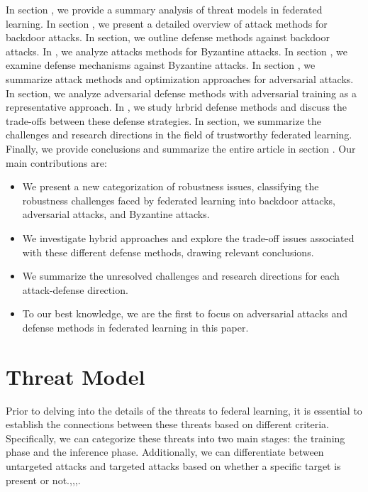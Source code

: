 \documentclass[conference]{IEEEtran}
\begin{document}
In section \uppercase\expandafter{}, we provide a summary analysis of threat models in federated learning.
In section \uppercase\expandafter{}, we present a detailed overview of attack methods for backdoor attacks.
In \uppercase\expandafter{} section, we outline defense methods against backdoor attacks.
In \uppercase\expandafter{}, we analyze attacks methods for Byzantine attacks.
In section \uppercase\expandafter{}, we examine defense mechanisms against Byzantine attacks.
In section \uppercase\expandafter{}, we summarize attack methods and optimization approaches for adversarial attacks.
In \uppercase\expandafter{} section, we analyze adversarial defense methods with adversarial training as a representative approach.
In \uppercase\expandafter{}, we study hrbrid defense methods and discuss the trade-offs between these defense strategies.
In \uppercase\expandafter{} section, we summarize the challenges and research directions in the field of trustworthy federated learning.
Finally, we provide conclusions and summarize the entire article in section \uppercase\expandafter{}.
Our main contributions are:
\begin{itemize}
    \item We present a new categorization of robustness issues, classifying the robustness challenges faced by federated learning into backdoor attacks, adversarial attacks, and Byzantine attacks.
    \item We investigate hybrid approaches and explore the trade-off issues associated with these different defense methods, drawing relevant conclusions.
    \item We summarize the unresolved challenges and research directions for each attack-defense direction.
    \item To our best knowledge, we are the first to focus on adversarial attacks and defense methods in federated learning in this paper.
\end{itemize}



\section{Threat Model}
Prior to delving into the details of the threats to federal learning, it is essential
to establish the connections between these threats based on different criteria.
Specifically, we can categorize these threats into two main stages:
the training phase and the inference phase. Additionally, we can
differentiate between untargeted attacks and targeted attacks based
on whether a specific target is present or not.\cite{b38},\cite{b39},\cite{b40},\cite{b41}.
\end{document}
